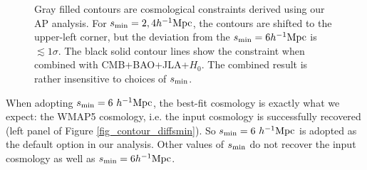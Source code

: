\documentclass[iop]{emulateapj}
\begin{document}
\begin{figure}
{   Gray filled contours are cosmological constraints derived using our AP analysis.
   For $s_{\rm min}=2,4h^{-1}{\rm Mpc}$, the contours are shifted to the upper-left corner, 
   but the deviation from the $s_{\rm min}=6h^{-1}{\rm Mpc}$ is $\lesssim1\sigma$.
   The black solid contour lines show the constraint when combined with CMB+BAO+JLA+$H_0$.
   The combined result is rather insensitive to choices of $s_{\rm min}$.}
\end{figure}

When adopting $s_{\rm min}=6\ h^{-1}{\rm Mpc}$, the best-fit cosmology is exactly what we expect: the WMAP5 cosmology, 
i.e. the input cosmology is successfully recovered (left panel of Figure \ref{fig_contour_diffsmin}).
So $s_{\rm min}=6\ h^{-1}{\rm Mpc}$ is adopted as the default option in our analysis.
Other values of $s_{\rm min}$ do not recover the input cosmology as well as $s_{\rm min}=6h^{-1}{\rm Mpc}$.
\end{document}
